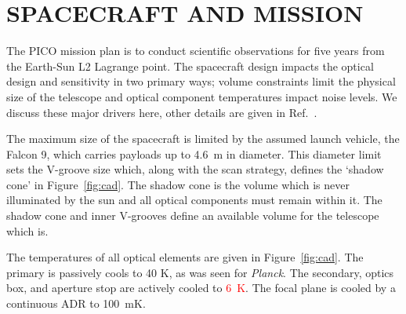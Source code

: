\documentclass[]{spie}  %
\newcommand{\comr}[1]{\textcolor{red}{#1}}
\begin{document}






\section{SPACECRAFT AND MISSION}
\label{sec:spacecraft}


The PICO mission plan is to conduct scientific observations for five years from the Earth-Sun L2 Lagrange point. The spacecraft design impacts 
the optical design and sensitivity in two primary ways; volume constraints limit the physical size of the telescope and optical component 
temperatures impact noise levels.  We discuss these major drivers here, other details are given in Ref.~.  

The maximum size of the spacecraft is limited by the assumed launch vehicle, the Falcon 9, which carries payloads up to 4.6~m in diameter. 
This diameter limit sets the V-groove size which, along with the scan strategy, defines the `shadow cone' in Figure~\ref{fig:cad}.  
The shadow cone is the volume which is never illuminated by the sun and all optical components must remain within it. The shadow cone and 
inner V-grooves define an available volume for the telescope which is.

The temperatures of all optical elements are given in Figure~\ref{fig:cad}.  The primary is passively cools to 40 K, as was 
seen for \textit{Planck}\cite{planck2011_hfi_temp}.  The secondary, optics box, and aperture stop are actively cooled to \comr{6~K}.  The focal plane is cooled 
by a continuous ADR to 100~mK.
\end{document}
